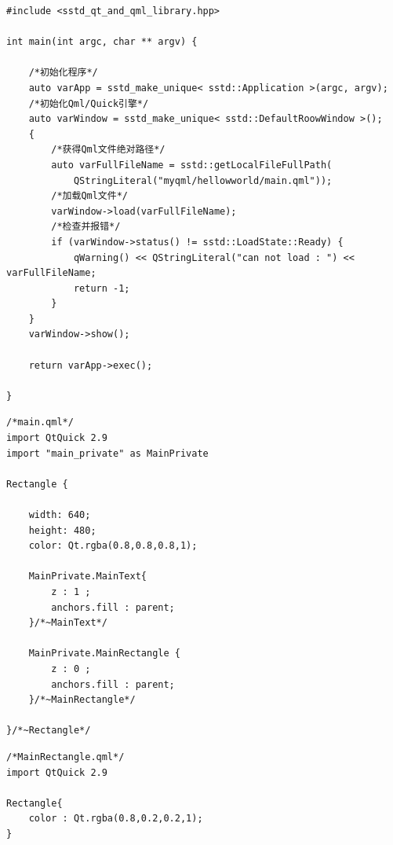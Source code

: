 \begin{lstlisting}[label=f000030,
caption=GoodLuck,
title=\lstlistingname\ \thelstlisting
]
#include <sstd_qt_and_qml_library.hpp>

int main(int argc, char ** argv) {

    /*初始化程序*/
    auto varApp = sstd_make_unique< sstd::Application >(argc, argv);
    /*初始化Qml/Quick引擎*/
    auto varWindow = sstd_make_unique< sstd::DefaultRoowWindow >();
    {
        /*获得Qml文件绝对路径*/
        auto varFullFileName = sstd::getLocalFileFullPath(
            QStringLiteral("myqml/hellowworld/main.qml"));
        /*加载Qml文件*/
        varWindow->load(varFullFileName);
        /*检查并报错*/
        if (varWindow->status() != sstd::LoadState::Ready) {
            qWarning() << QStringLiteral("can not load : ") << varFullFileName;
            return -1;
        }
    }
    varWindow->show();

    return varApp->exec();

}
\end{lstlisting}          %
\begin{lstlisting}[label=f000031,
caption=GoodLuck,
title=\lstlistingname\ \thelstlisting
]
/*main.qml*/
import QtQuick 2.9
import "main_private" as MainPrivate

Rectangle {

    width: 640;
    height: 480;
    color: Qt.rgba(0.8,0.8,0.8,1);

    MainPrivate.MainText{
        z : 1 ;
        anchors.fill : parent;
    }/*~MainText*/

    MainPrivate.MainRectangle {
        z : 0 ;
        anchors.fill : parent;
    }/*~MainRectangle*/

}/*~Rectangle*/
\end{lstlisting}          %
\begin{lstlisting}[label=f000032,
caption=GoodLuck,
title=\lstlistingname\ \thelstlisting
]
/*MainRectangle.qml*/
import QtQuick 2.9

Rectangle{
    color : Qt.rgba(0.8,0.2,0.2,1);
}
\end{lstlisting}          %
